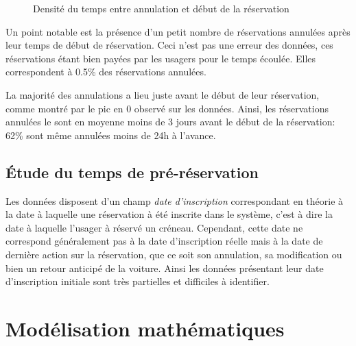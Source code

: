 \documentclass[12pt,a4paper]{article}
\newcommand{\1}[1]{\mathbbm{1}_{\{#1\}} }
\theoremstyle{definition}
\begin{document}
{\begin{figure}[!h]
\centering
{}
\caption{Densité du temps entre annulation et début de la réservation}
\label{délai_annulation_début}
\end{figure}


Un point notable est la présence d'un petit nombre de réservations annulées après leur temps de début de réservation. Ceci n'est pas une erreur des données, ces réservations étant bien payées par les usagers pour le temps écoulée. Elles correspondent à 0.5\% des réservations annulées.

La majorité des annulations a lieu juste avant le début de leur réservation, comme montré par le pic en 0 observé sur les données. Ainsi, les réservations annulées le sont en moyenne moins de 3 jours avant le début de la réservation: 62\% sont même annulées moins de 24h à l'avance.


	
\subsection{Étude du temps de pré-réservation}

Les données disposent d'un champ \emph{date d'inscription} correspondant en théorie à la date à laquelle une réservation à été inscrite dans le système, c'est à dire la date à laquelle l'usager à réservé un créneau. Cependant, cette date ne correspond généralement pas à la date d'inscription réelle mais à la date de dernière action sur la réservation, que ce soit son annulation, sa modification ou bien un retour anticipé de la voiture. Ainsi les données présentant leur  date d'inscription initiale sont très partielles et difficiles à identifier.

\section{Modélisation mathématiques}

}
\end{document}
